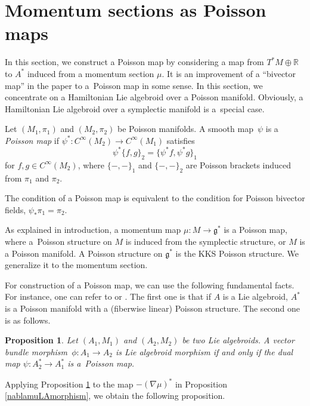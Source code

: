 \documentclass[pdftex]{sigma}
\numberwithin{equation}{section}
\newtheorem{Proposition}[Theorem]{Proposition}
 { \theoremstyle{definition}
\newtheorem{Definition}[Theorem]{Definition}
\newtheorem{Note}[Theorem]{Note}
\newtheorem{Example}[Theorem]{Example}
\newtheorem{Remark}[Theorem]{Remark}
\newtheorem{Question}[Theorem]{Question}
 }
\def\bR{{\mathbb{R}}}
\newcommand{\sbv}[2]{{\{{{#1},{#2}}\}}}
\begin{document}
\section{Momentum sections as Poisson maps}\label{sec5}
In this section, we construct a Poisson map
by considering a map from $T^*M \oplus \bR$ to $A^*$ induced from a momentum section $\mu$.
It is an improvement of a ``bivector map'' in the paper
\cite{Blohmann:2023} to a~Poisson map in some sense.
In this section, we concentrate on a Hamiltonian Lie algebroid over a Poisson manifold. Obviously, a Hamiltonian Lie algebroid over a symplectic manifold is a~special case.

\begin{Definition}
Let $(M_1, \pi_1)$ and $(M_2, \pi_2)$ be Poisson manifolds.
A smooth map~$\psi$ is a \textit{Poisson map} if
$\psi^*\colon C^{\infty}(M_2) \rightarrow C^{\infty}(M_1)$ satisfies
\[
\psi^* \sbv{f}{g}_2 = \sbv{\psi^* f}{\psi^* g}_1
\]
for $f, g \in C^{\infty}(M_2)$, where $\sbv{-}{-}_1$
and $\sbv{-}{-}_2$ are Poisson brackets induced from $\pi_1$ and $\pi_2$.
\end{Definition}
The condition of a Poisson map is equivalent to the condition for Poisson bivector fields,
$
\psi_* \pi_1 = \pi_2$.


As explained in introduction, a momentum map $\mu\colon M \rightarrow \mathfrak{g}^*$
is a Poisson map, where a~Poisson structure on $M$ is induced from the symplectic structure, or $M$ is a Poisson manifold. A Poisson structure on $\mathfrak{g}^*$ is the KKS Poisson structure.
We generalize it to the momentum section.

For construction of a Poisson map,
we can use the following fundamental facts.
For instance, one can refer to \cite[Theorem 13.70]{CrainicFernandesMurcut} or
 \cite[Proposition 2.13]{Meinrenken02}.
The first one is that
if $A$ is a Lie algebroid, $A^*$ is a Poisson manifold
with a (fiberwise linear) Poisson structure.
The second one is as follows.
\begin{Proposition}\label{dualPoisson}
Let $(A_1, M_1)$ and $(A_2, M_2)$ be two Lie algebroids.
A vector bundle morphism~${\phi\colon A_1 \rightarrow A_2}$ is Lie algebroid morphism
if and only if the dual map $\psi\colon A_2^* \rightarrow A_1^*$ is a~Poisson map.
\end{Proposition}

Applying Proposition \ref{dualPoisson} to the map
$-(\nabla \mu)^*$ in Proposition \ref{nablamuLAmorphism},
we obtain the following proposition.
\end{document}
